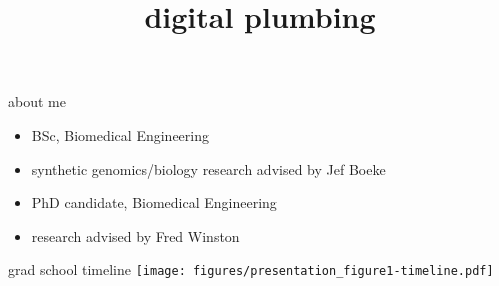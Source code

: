 \documentclass[aspectratio=169]{beamer}
\title{digital plumbing}
\begin{document}
\begin{frame}
    \titlepage
\end{frame}

\begin{frame}{about me}
    \begin{description}[align=right]
        \setlength{\itemsep}{1cm}
        \item[undergrad:]
            \begin{itemize}
                \item BSc, Biomedical Engineering
                \item synthetic genomics/biology research advised by Jef Boeke
            \end{itemize}
        \item[currently:]
            \begin{itemize}
                \item PhD candidate, Biomedical Engineering
                \item research advised by Fred Winston
            \end{itemize}
    \end{description}
\end{frame}

\begin{frame}{grad school timeline}
\texttt{[image: figures/presentation\_figure1-timeline.pdf]}
\end{frame}

{
    \begin{frame}[plain]
    \end{frame}
}
\end{document}
